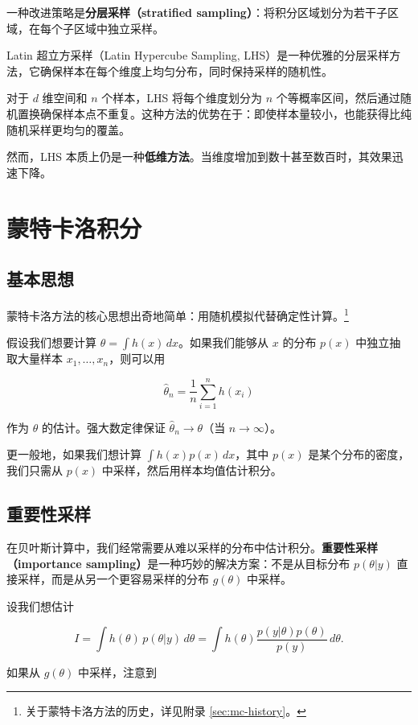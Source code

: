 一种改进策略是\textbf{分层采样（stratified sampling）}：将积分区域划分为若干子区域，在每个子区域中独立采样。

Latin 超立方采样（Latin Hypercube Sampling, LHS）是一种优雅的分层采样方法，它确保样本在每个维度上均匀分布，同时保持采样的随机性。

对于 $d$ 维空间和 $n$ 个样本，LHS 将每个维度划分为 $n$ 个等概率区间，然后通过随机置换确保样本点不重复。这种方法的优势在于：即使样本量较小，也能获得比纯随机采样更均匀的覆盖。

然而，LHS 本质上仍是一种\textbf{低维方法}。当维度增加到数十甚至数百时，其效果迅速下降。

\section{蒙特卡洛积分}

\subsection{基本思想}

蒙特卡洛方法的核心思想出奇地简单：用随机模拟代替确定性计算。\footnote{关于蒙特卡洛方法的历史，详见附录 \cref{sec:mc-history}。}

假设我们想要计算 $\theta = \int h(x) \, dx$。如果我们能够从 $x$ 的分布 $p(x)$ 中独立抽取大量样本 $x_1, \ldots, x_n$，则可以用

\[
\hat{\theta}_n = \frac{1}{n} \sum_{i=1}^n h(x_i)
\]

作为 $\theta$ 的估计。强大数定律保证 $\hat{\theta}_n \to \theta$（当 $n \to \infty$）。

更一般地，如果我们想计算 $\int h(x) p(x) \, dx$，其中 $p(x)$ 是某个分布的密度，我们只需从 $p(x)$ 中采样，然后用样本均值估计积分。

\subsection{重要性采样}

在贝叶斯计算中，我们经常需要从难以采样的分布中估计积分。\textbf{重要性采样（importance sampling）}是一种巧妙的解决方案：不是从目标分布 $p(\theta | y)$ 直接采样，而是从另一个更容易采样的分布 $g(\theta)$ 中采样。

设我们想估计

\[
I = \int h(\theta) \, p(\theta | y) \, d\theta = \int h(\theta) \frac{p(y | \theta) p(\theta)}{p(y)} \, d\theta.
\]

如果从 $g(\theta)$ 中采样，注意到

